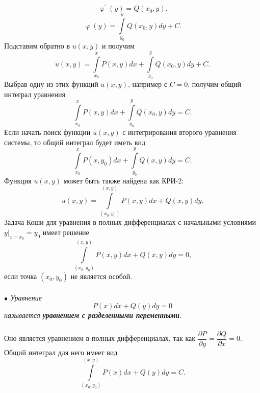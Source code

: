 \documentclass[a4paper, 12pt]{report}
\renewcommand{\varphi}{\upvarphi}
\renewcommand{\d}{\partial}
\begin{document}
$$\varphi^\prime(y) = Q(x_0,y).$$
$$\varphi(y) = \int\limits_{y_0}^y Q(x_0,y)dy + C.$$
Подставим обратно в $u(x,y)$ и получим $$u(x,y) =\int\limits^x_{x_0}P(x,y)dx  +  \int\limits_{y_0}^y Q(x_0,y)dy + C.$$
Выбрав одну из этих функций $u(x,y)$, например с $C = 0$, получим общий интеграл уравнения $$\int\limits^x_{x_0}P(x,y)dx  +  \int\limits_{y_0}^y Q(x_0,y)dy = C.$$
Если начать поиск функции $u(x,y)$ с интегрирования второго уравнения системы, то общий интеграл будет иметь вид $$\int\limits^x_{x_0}P(x,y_0)dx  +  \int\limits_{y_0}^y Q(x,y)dy = C.$$
Функция $u(x,y)$ может быть также найдена как КРИ-2: $$u(x,y) = \int\limits_{(x_0,y_0)}^{(x,y)}P(x,y)dx + Q(x,y) dy.$$
Задача Коши для уравнения в полных дифференциалах с начальными условиями $y|_{x=x_0} = y_0$ имеет решение $$\int\limits_{(x_0,y_0)}^{(x,y)}P(x,y)dx + Q(x,y) dy = 0,$$
если точка $(x_0,y_0)$ не является особой.\\\\
$\bullet$ \textit{Уравнение $$P(x)dx + Q(y)dy = 0$$ называется \textbf{уравнением с разделенными переменными}.}\\\\
Оно является уравнением в полных дифференциалах, так как $\dfrac{\d P}{\d y} = \dfrac{\d Q}{\d x} = 0$. Общий интеграл для него имеет вид $$\int\limits_{(x_0,y_0)}^{(x,y)}P(x)dx + Q(y) dy = C.$$
\end{document}
